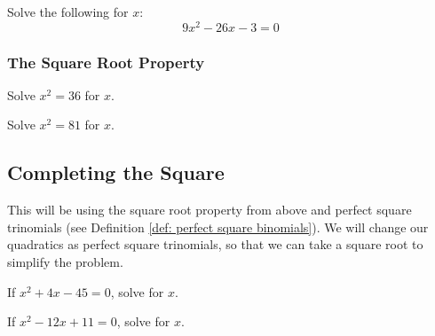\begin{exercise}
Solve the following for $x$:
\[
9x^2-26x-3=0
\]
\end{exercise}
\begin{solution}[3.5in]

\end{solution}
\vspace{0.5em}

\subsubsection{The Square Root Property}

\begin{exercise}
Solve $x^2=36$ for $x$.
\end{exercise}
\begin{solution}[1.5in]

\end{solution}

\begin{exercise}
Solve $x^2=81$ for $x$.
\end{exercise}
\begin{solution}[1.5in]

\end{solution}

\subsection{Completing the Square}

This will be using the square root property from above and perfect square trinomials
(see Definition \ref{def: perfect square binomials}). We will change our quadratics as
perfect square trinomials, so that we can take a square root to simplify the problem.

\begin{exercise}
If $x^2+4x-45=0$, solve for $x$.
\end{exercise}
\begin{solution}[2in]

\end{solution}
\vspace{0.5em}

\newpage

\begin{exercise}
If $x^2-12x+11=0$, solve for $x$.
\end{exercise}
\begin{solution}[2in]

\end{solution}
\vspace{0.5em}

